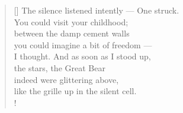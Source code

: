 \documentclass[a4paper,12pt,twoside,final]{book}
\begin{document}
\settowidth{\versewidth}{The silence listened intently --- One struck.}

\begin{verse}[\versewidth]
  The silence listened intently --- One struck. \\
  You could visit your childhood; \\
  between the damp cement walls \\
  you could imagine a bit of freedom --- \\
  I thought. And as soon as I stood up, \\
  the stars, the Great Bear \\
  indeed were glittering above, \\
  like the grille up in the silent cell. \\!
\end{verse}


\newpage

\settowidth{\versewidth}{gondoltam. S hát hát amint fölállok}
\end{document}
